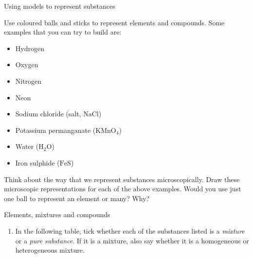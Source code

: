 \vspace{-1cm}
  \label{m38708*eip-326}
\begin{activity}{Using models to represent substances}{Use coloured balls and sticks to represent elements and compounds. Some examples that you can try to build are:
\label{m38708*eip-id1166921187210}
\begin{itemize}[noitemsep]
    \item Hydrogen
    \item Oxygen
    \item Nitrogen
    \item Neon
    \item Sodium chloride (salt, $\mathrm{NaCl}$)
    \item Potassium permanganate (${\mathrm{KMnO}}_{4}$)
    \item Water (${\mathrm{H}}_{2}\mathrm{O}$)
    \item Iron sulphide ($\mathrm{FeS}$)
\end{itemize}
Think about the way that we represent substances microscopically. Draw these microscopic representations for each of the above examples. Would you use just one ball to represent an element or many? Why? }\par \label{m38708*secfhsst!!!underscore!!!id212}
            \begin{exercises}{Elements, mixtures and compounds}{
            \nopagebreak
            \label{m38708*id63472}
 \begin{enumerate}[noitemsep, label=\textbf{\arabic*}. ] 
            \label{m38708*uid28}
    \item In the following table, tick whether each of the substances listed is a \textsl{mixture} or a \textsl{pure substance}. If it is a mixture, also say whether it is a homogeneous or heterogeneous mixture.
          \begin{table}[H]
        \begin{center}
      \label{m38708*id63499}
    \noindent
      \tablelasttail{}
      \begin{xtabular}[t]{|l|l|l|}\hline

\end{xtabular}
\end{center}
\end{table}
\end{enumerate}}
\end{exercises}
\end{activity}
